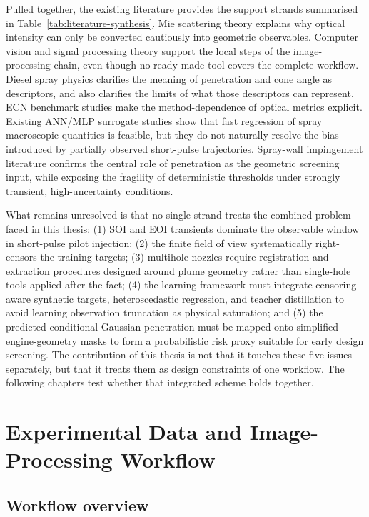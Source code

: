 \documentclass[english, 12pt, a4paper, elec, utf8, a-2b, online]{aaltothesis}
\begin{document}
Pulled together, the existing literature provides the support strands summarised in Table~\ref{tab:literature-synthesis}. 
Mie scattering theory explains why optical intensity can only be converted cautiously into geometric observables. 
Computer vision and signal processing theory support the local steps of the image-processing chain, 
even though no ready-made tool covers the complete workflow. 
Diesel spray physics clarifies the meaning of penetration and cone angle as descriptors, 
and also clarifies the limits of what those descriptors can represent. 
ECN benchmark studies make the method-dependence of optical metrics explicit. 
Existing ANN/MLP surrogate studies show that fast regression of spray macroscopic quantities is feasible, 
but they do not naturally resolve the bias introduced by partially observed short-pulse trajectories. 
Spray-wall impingement literature confirms the central role of penetration as the geometric screening input, 
while exposing the fragility of deterministic thresholds under strongly transient, high-uncertainty conditions.

What remains unresolved is that no single strand treats the combined problem faced in this thesis: 
(1) SOI and EOI transients dominate the observable window in short-pulse pilot injection; 
(2) the finite field of view systematically right-censors the training targets; 
(3) multihole nozzles require registration and extraction procedures designed around plume geometry rather than single-hole tools applied after the fact; 
(4) the learning framework must integrate censoring-aware synthetic targets, heteroscedastic regression, 
and teacher distillation to avoid learning observation truncation as physical saturation; and 
(5) the predicted conditional Gaussian penetration must be mapped onto simplified engine-geometry masks 
to form a probabilistic risk proxy suitable for early design screening. 
The contribution of this thesis is not that it touches these five issues separately, 
but that it treats them as design constraints of one workflow. 
The following chapters test whether that integrated scheme holds together.

\section{Experimental Data and Image-Processing Workflow}

\subsection{Workflow overview}
\end{document}
